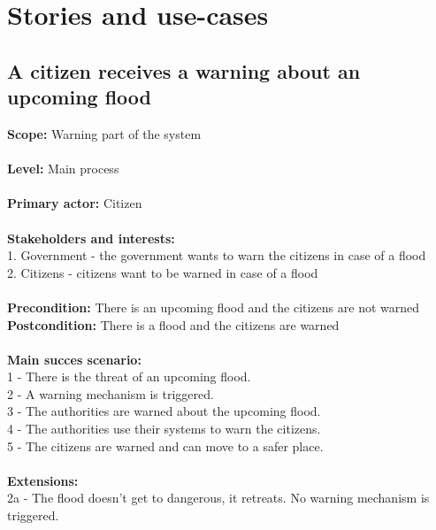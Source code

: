 \section{Stories and use-cases}
\subsection{A citizen receives a warning about an upcoming flood}
\textbf{Scope:} Warning part of the system\\\\
\textbf{Level:} Main process\\\\
\textbf{Primary actor:} Citizen\\\\
\textbf{Stakeholders and interests:}\\
	1. Government - the government wants to warn the citizens in case of a flood \\
	2. Citizens - citizens want to be warned in case of a flood \\\\
\textbf{Precondition:} There is an upcoming flood and the citizens are not warned\\
\textbf{Postcondition:} There is a flood and the citizens are warned\\\\
\textbf{Main succes scenario:} \\
1 - There is the threat of an upcoming flood.\\
2 - A warning mechanism is triggered.\\
3 - The authorities are warned about the upcoming flood.\\
4 - The authorities use their systems to warn the citizens.\\
5 - The citizens are warned and can move to a safer place.\\\\
\textbf{Extensions:} \\
2a - The flood doesn't get to dangerous, it retreats. No warning mechanism is triggered.

